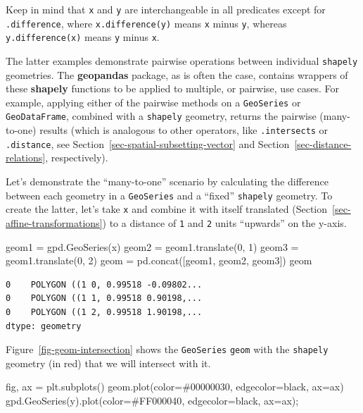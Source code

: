 \documentclass[
  letterpaper,
]{krantz}
\newenvironment{Shaded}{\begin{snugshade}}{\end{snugshade}}
\newcommand{\DecValTok}[1]{\textcolor[rgb]{0.68,0.00,0.00}{#1}}
\newcommand{\NormalTok}[1]{\textcolor[rgb]{0.00,0.23,0.31}{#1}}
\newcommand{\OperatorTok}[1]{\textcolor[rgb]{0.37,0.37,0.37}{#1}}
\newcommand{\StringTok}[1]{\textcolor[rgb]{0.13,0.47,0.30}{#1}}
\begin{document}
Keep in mind that \texttt{x} and \texttt{y} are interchangeable in all
predicates except for \texttt{.difference}, where
\texttt{x.difference(y)} means \texttt{x} minus \texttt{y}, whereas
\texttt{y.difference(x)} means \texttt{y} minus \texttt{x}.

The latter examples demonstrate pairwise operations between individual
\texttt{shapely} geometries. The \textbf{geopandas} package, as is often
the case, contains wrappers of these \textbf{shapely} functions to be
applied to multiple, or pairwise, use cases. For example, applying
either of the pairwise methods on a \texttt{GeoSeries} or
\texttt{GeoDataFrame}, combined with a \texttt{shapely} geometry,
returns the pairwise (many-to-one) results (which is analogous to other
operators, like \texttt{.intersects} or \texttt{.distance}, see
Section~\ref{sec-spatial-subsetting-vector} and
Section~\ref{sec-distance-relations}, respectively).

Let's demonstrate the ``many-to-one'' scenario by calculating the
difference between each geometry in a \texttt{GeoSeries} and a ``fixed''
\texttt{shapely} geometry. To create the latter, let's take \texttt{x}
and combine it with itself translated
(Section~\ref{sec-affine-transformations}) to a distance of \texttt{1}
and \texttt{2} units ``upwards'' on the y-axis.

\begin{Shaded}
\begin{Highlighting}[]
\NormalTok{geom1 }\OperatorTok{=}\NormalTok{ gpd.GeoSeries(x)}
\NormalTok{geom2 }\OperatorTok{=}\NormalTok{ geom1.translate(}\DecValTok{0}\NormalTok{, }\DecValTok{1}\NormalTok{)}
\NormalTok{geom3 }\OperatorTok{=}\NormalTok{ geom1.translate(}\DecValTok{0}\NormalTok{, }\DecValTok{2}\NormalTok{)}
\NormalTok{geom }\OperatorTok{=}\NormalTok{ pd.concat([geom1, geom2, geom3])}
\NormalTok{geom}
\end{Highlighting}
\end{Shaded}

\begin{verbatim}
0    POLYGON ((1 0, 0.99518 -0.09802...
0    POLYGON ((1 1, 0.99518 0.90198,...
0    POLYGON ((1 2, 0.99518 1.90198,...
dtype: geometry
\end{verbatim}

Figure~\ref{fig-geom-intersection} shows the \texttt{GeoSeries}
\texttt{geom} with the \texttt{shapely} geometry (in red) that we will
intersect with it.

\begin{Shaded}
\begin{Highlighting}[]
\NormalTok{fig, ax }\OperatorTok{=}\NormalTok{ plt.subplots()}
\NormalTok{geom.plot(color}\OperatorTok{=}\StringTok{\textquotesingle{}\#00000030\textquotesingle{}}\NormalTok{, edgecolor}\OperatorTok{=}\StringTok{\textquotesingle{}black\textquotesingle{}}\NormalTok{, ax}\OperatorTok{=}\NormalTok{ax)}
\NormalTok{gpd.GeoSeries(y).plot(color}\OperatorTok{=}\StringTok{\textquotesingle{}\#FF000040\textquotesingle{}}\NormalTok{, edgecolor}\OperatorTok{=}\StringTok{\textquotesingle{}black\textquotesingle{}}\NormalTok{, ax}\OperatorTok{=}\NormalTok{ax)}\OperatorTok{;}
\end{Highlighting}
\end{Shaded}
\end{document}
